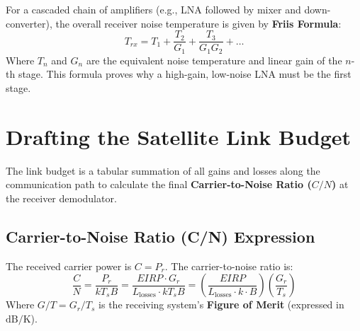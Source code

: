 \documentclass[12pt,a4paper]{article}
\begin{document}
For a cascaded chain of amplifiers (e.g., LNA followed by mixer and down-converter), the overall receiver noise temperature is given by \textbf{Friis Formula}:
\begin{equation}
  T_{rx} = T_1 + \frac{T_2}{G_1} + \frac{T_3}{G_1 G_2} + \dots
\end{equation}
Where $T_n$ and $G_n$ are the equivalent noise temperature and linear gain of the $n$-th stage. This formula proves why a high-gain, low-noise LNA must be the first stage.

\section{Drafting the Satellite Link Budget}

The link budget is a tabular summation of all gains and losses along the communication path to calculate the final \textbf{Carrier-to-Noise Ratio ($C/N$)} at the receiver demodulator.

\begin{tcolorbox}[tikzbox, title={Link Budget System Model}]
\centering
{}
\end{tcolorbox}

\subsection{Carrier-to-Noise Ratio (C/N) Expression}
The received carrier power is $C = P_r$. The carrier-to-noise ratio is:
\begin{equation}
  \frac{C}{N} = \frac{P_r}{k T_s B} = \frac{EIRP \cdot G_r}{L_{\text{losses}} \cdot k T_s B} = \left(\frac{EIRP}{L_{\text{losses}} \cdot k \cdot B}\right) \left(\frac{G_r}{T_s}\right)
\end{equation}
Where $G/T = G_r/T_s$ is the receiving system's \textbf{Figure of Merit} (expressed in $\text{dB/K}$).
\end{document}
